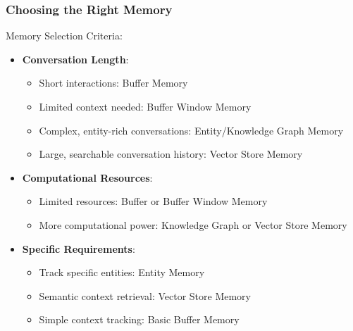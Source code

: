 \begin{frame}\frametitle{Choosing the Right Memory}

Memory Selection Criteria:
\begin{itemize}
\item \textbf{Conversation Length}: 
    \begin{itemize}
    \item Short interactions: Buffer Memory
    \item Limited context needed: Buffer Window Memory
    \item Complex, entity-rich conversations: Entity/Knowledge Graph Memory
    \item Large, searchable conversation history: Vector Store Memory
    \end{itemize}

\item \textbf{Computational Resources}:
    \begin{itemize}
    \item Limited resources: Buffer or Buffer Window Memory
    \item More computational power: Knowledge Graph or Vector Store Memory
    \end{itemize}

\item \textbf{Specific Requirements}:
    \begin{itemize}
    \item Track specific entities: Entity Memory
    \item Semantic context retrieval: Vector Store Memory
    \item Simple context tracking: Basic Buffer Memory
    \end{itemize}
\end{itemize}

\end{frame}


